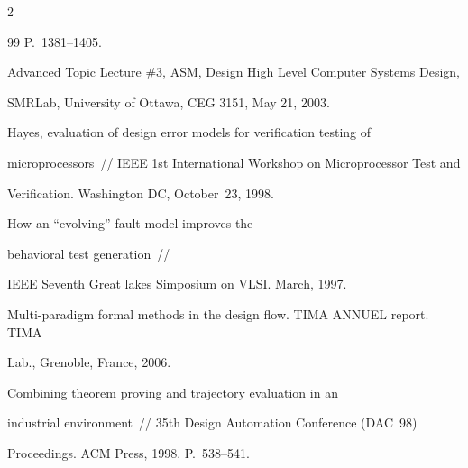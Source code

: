 \begin{multicols}{2}
{{\begin{thebibliography}{99}
P.~1381--1405.









Advanced Topic Lecture \#3, ASM, Design High Level Computer Systems Design,


SMRLab, University of Ottawa, CEG 3151, May 21, 2003.









Hayes, evaluation of design error models for verification testing of


micro\-processors~//  IEEE 1st International Workshop on Micro\-processor Test and


Verification. Washington DC, October~23, 1998.









How an ``evolving'' fault model improves the


behavioral test generation~//


IEEE Seventh Great lakes Simposium on VLSI. March, 1997.









Multi-paradigm formal methods in the design flow. TIMA ANNUEL report. TIMA


Lab., Grenoble, France, 2006.









Combining theorem proving and trajectory evaluation in an


industrial environment~// 35th Design Automation Conference (DAC~98)


Proceedings. ACM Press, 1998. P.~538--541.








\end{thebibliography}}}
\end{multicols}

